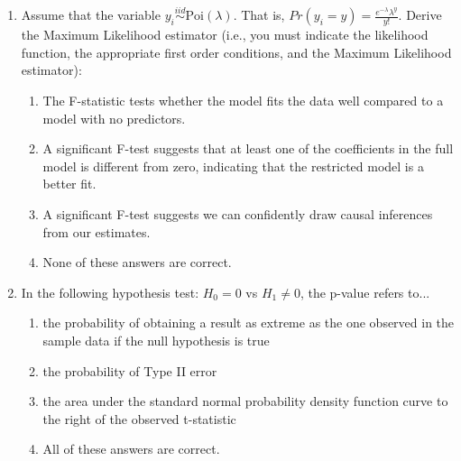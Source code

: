 \documentclass{article}
\begin{document}
\begin{enumerate}
\newpage

\item  Assume that the variable $y_i\stackrel{iid}{\sim}\text{Poi}(\lambda)$. That is, $Pr(y_i=y) = \frac{e^{-\lambda} \lambda^{y}}{y!}$. Derive the Maximum Likelihood estimator (i.e., you must indicate the likelihood function, the appropriate first order conditions, and the Maximum Likelihood estimator):

\begin{enumerate}[label=\alph*)]
\item The F-statistic tests whether the model fits the data well compared to a model with no predictors.
\item A significant F-test suggests that at least one of the coefficients in the full model is different from zero, indicating that the restricted model is a better fit.
\item A significant F-test suggests we can confidently draw causal inferences from our estimates.
\item None of these answers are correct.
\end{enumerate}\vspace{.25cm}

\item In the following hypothesis test: $H_0 = 0$ vs $H_1 \neq 0$, the p-value refers to...

\begin{enumerate}[label=\alph*)]
\item the probability of obtaining a result as extreme as the one observed in the sample data if the null hypothesis is true
\item the probability of Type II error
\item the area under the standard normal probability density function curve to the right of the observed t-statistic
\item All of these answers are correct.
\end{enumerate}\vspace{.25cm}


\end{enumerate}\vspace{.25cm}
\end{document}
